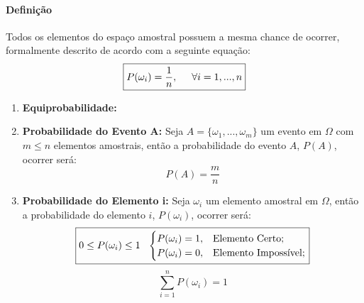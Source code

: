 \documentclass{article}
\begin{document}
            \paragraph{Definição}Todos os elementos do espaço amostral possuem a mesma chance de ocorrer, formalmente descrito de acordo com a seguinte equação:
                \begin{equation}
                    \boxed{
                        P(\omega_{i}) = \frac{1}{n},
                        \hspace{5mm}
                        \forall i = 1, ..., n
                    }
                \end{equation}

                \begin{enumerate}[noitemsep]
                    \item \textbf{Equiprobabilidade:} 
                    \item \textbf{Probabilidade do Evento A:} Seja $A = \{ \omega_{1}, ..., \omega_{m} \}$ um evento em $\Omega$ com $m \le n$ elementos amostrais, então a probabilidade do evento $A$, $P(A)$, ocorrer será:
                        \begin{equation}
                            \boxed{
                                P(A) = \frac{m}{n}
                            }
                        \end{equation}
                    \item \textbf{Probabilidade do Elemento i:} Seja $\omega_{i}$ um elemento amostral em $\Omega$, então a probabilidade do elemento $i$, $P(\omega_{i})$, ocorrer será:
                        \begin{equation}
                            \boxed{
                                0 \le P(\omega_{i}) \le 1
                                \hspace{2.5mm}
                                \begin{cases}
                                    P(\omega_{i}) = 1, & \text{Elemento Certo};\\
                                    P(\omega_{i}) = 0, & \text{Elemento Impossível};
                                \end{cases}
                            }
                        \end{equation}
                        \begin{equation}
                            \boxed{
                                \sum_{i=1}^{n} P(\omega_{i}) = 1
                            }
                        \end{equation}
                \end{enumerate}
\end{document}
